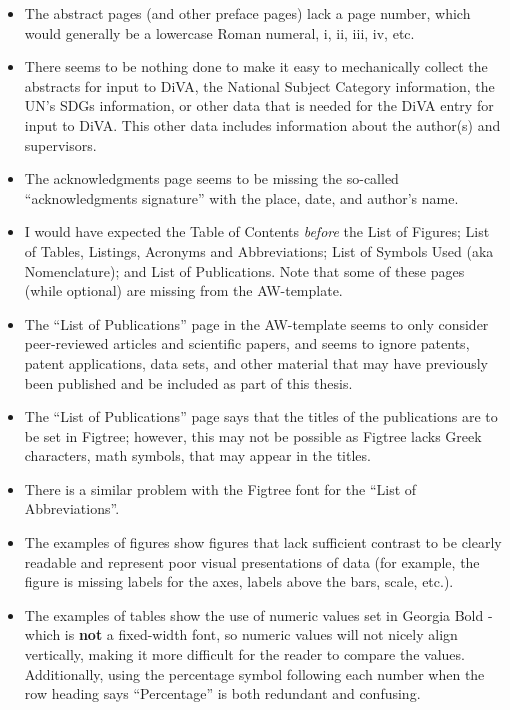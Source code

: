\documentclass[12pt, twoside]{article}
\begin{document}
\clearpage
\begin{itemize}[resume*, label=\color{red}]
\item The abstract pages (and other preface pages) lack a page number, which would generally be a lowercase Roman numeral, \ie i, ii, iii, iv, etc.

\item There seems to be nothing done to make it easy to mechanically collect the abstracts for input to \gls{DiVA}, the National Subject Category information, the UN's \glspl{SDG} information, or other data that is needed for the \gls{DiVA} entry for input to \gls{DiVA}. This other data includes information about the author(s) and supervisors.

\item The acknowledgments page seems to be missing the so-called \enquote{acknowledgments signature} with the place, date, and author's name.

\item I would have expected the Table of Contents \textit{before} the List of Figures; List of Tables, Listings, Acronyms and Abbreviations; List of Symbols Used (aka Nomenclature); and List of Publications. Note that some of these pages (while optional) are missing from the AW-template.

\item The \enquote{List of Publications} page in the AW-template seems to only consider peer-reviewed articles and scientific papers, and seems to ignore patents, patent applications, data sets, and other material that may have previously been published and be included as part of this thesis.

\item The \enquote{List of Publications} page says that the titles of the publications are to be set in Figtree; however, this may not be possible as Figtree lacks Greek characters, math symbols, \etc that may appear in the titles.

\item There is a similar problem with the Figtree font for the \enquote{List of
Abbreviations}.

\item The examples of figures show figures that lack sufficient contrast to be clearly readable and represent poor visual presentations of data (for example, the figure is missing labels for the axes, labels above the bars, scale, etc.).

\item The examples of tables show the use of numeric values set in Georgia Bold - which is \textbf{not} a fixed-width font, so numeric values will not nicely align vertically, making it more difficult for the reader to compare the values. Additionally, using the percentage symbol following each number when the row heading says \enquote{Percentage} is both redundant and confusing.
\end{itemize}
\end{document}
